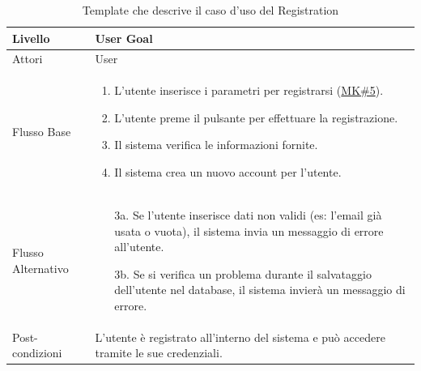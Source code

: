 \documentclass[10pt]{article}
\begin{document}
\begin{center}
\begin{table}[H]
{\begin{tabular}{|l|p{9cm}|}
Livello & User Goal \\ \hline
Attori & User \\ \hline
Flusso Base & 
\begin{enumerate}
    \item L'utente inserisce i parametri per registrarsi (\hyperref[mk5]{MK\#5}).
    \item L'utente preme il pulsante per effettuare la registrazione.
    \item Il sistema verifica le informazioni fornite.
    \item Il sistema crea un nuovo account per l’utente.
\end{enumerate} \\ \hline
Flusso Alternativo & 
\begin{enumerate}
    \item[3a.] Se l’utente inserisce dati non validi (es: l’email già usata o vuota), il sistema invia un messaggio di errore all’utente.
    \item[3b.] Se si verifica un problema durante il salvataggio dell’utente nel database, il sistema invierà un messaggio di errore.
\end{enumerate} \\ \hline
Post-condizioni & L’utente è registrato all’interno del sistema e può accedere tramite le sue credenziali. \\ \hline
\end{tabular}
}
\caption{Template che descrive il caso d'uso del Registration}
\end{table}
\begin{table}[H]
\vspace{-0.3cm}
\centering
{}
\end{table}
\end{center}
\end{document}
